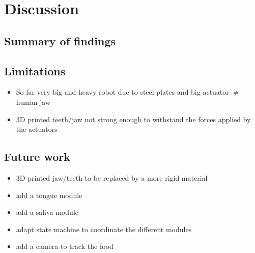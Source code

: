 \section{Discussion}
\subsection{Summary of findings}

\subsection{Limitations}
\begin{itemize}
    \item So far very big and heavy robot due to steel plates and big actuator \(\neq\) human jaw
    \item 3D printed teeth/jaw not strong enough to withstand the forces applied by the actuators
\end{itemize}

\subsection{Future work}
\begin{itemize}
    \item 3D printed jaw/teeth to be replaced by a more rigid material
    \item add a tongue module
    \item add a saliva module
    \item adapt state machine to coordinate the different modules
    \item add a camera to track the food
\end{itemize}
